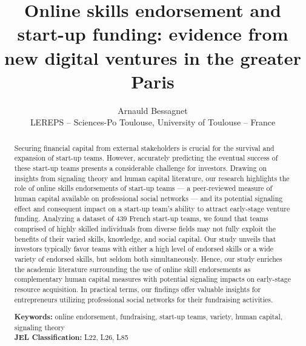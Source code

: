\documentclass[12pt]{article}
\begin{document}
\title{Online skills endorsement and start-up funding: evidence from new digital ventures in the greater Paris}
\date{\vspace{-3ex}}
\author{Arnauld Bessagnet \\ \footnotesize{LEREPS – Sciences-Po Toulouse, University of Toulouse – France} \\}

\maketitle \vspace{-1,5em}

\begin{abstract}
\footnotesize
Securing financial capital from external stakeholders is crucial for the survival and expansion of start-up teams. However, accurately predicting the eventual success of these start-up teams presents a considerable challenge for investors. Drawing on insights from signaling theory and human capital literature, our research highlights the role of online skills endorsements of start-up teams — a peer-reviewed measure of human capital available on professional social networks — and its potential signaling effect and consequent impact on a start-up team's ability to attract early-stage venture funding. Analyzing a dataset of 439 French start-up teams, we found that teams comprised of highly skilled individuals from diverse fields may not fully exploit the benefits of their varied skills, knowledge, and social capital. Our study unveils that investors typically favor teams with either a high level of endorsed skills or a wide variety of endorsed skills, but seldom both simultaneously. Hence, our study enriches the academic literature surrounding the use of online skill endorsements as complementary human capital measures with potential signaling impacts on early-stage resource acquisition. In practical terms, our findings offer valuable insights for entrepreneurs utilizing professional social networks for their fundraising activities. \newline

\begin{obeylines}
\noindent \footnotesize{}{\textbf{Keywords:} online endorsement, fundraising, start-up teams, variety, human capital, signaling theory}
\noindent \footnotesize{\textbf{JEL Classification:} L22, L26, L85}
\end{obeylines}

\end{abstract}
\end{document}
